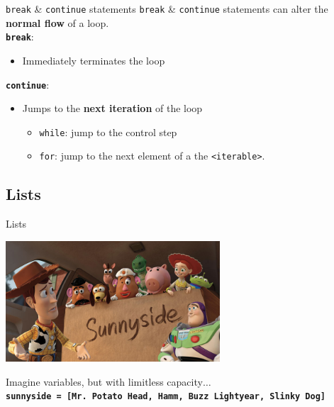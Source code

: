     \begin{frame}{\texttt{break} \& \texttt{continue} statements}
        \Large
        \texttt{break} \& \texttt{continue} statements can alter the \textbf{normal flow} of a loop.\\
        \pause
        \LARGE
        \texttt{\textbf{break}}:
        \begin{itemize}
            \pause
            \item Immediately terminates the loop
        \end{itemize}
        \pause
        \texttt{\textbf{continue}}:
        \pause
        \begin{itemize}
            \item Jumps to the \textbf{next iteration} of the loop
            \pause
            \begin{itemize}
                \large
                \item \texttt{while}: \pause jump to the control step \pause
                \item \texttt{for}: \pause jump to the next element of a the \texttt{<iterable>}.
            \end{itemize}
        \end{itemize}
    \end{frame}

    \subsection{Lists}

        \begin{frame}{Lists}
            \begin{center}
                \includegraphics[width=0.6\textwidth]{../Lecture1/images/box_many.jpg}                
            \end{center}
            \LARGE
            Imagine variables, but with limitless capacity$\dots$\\
            \textbf{\texttt{sunnyside = [\textquotesingle Mr. Potato Head\textquotesingle, \textquotesingle Hamm\textquotesingle,
            \textquotesingle Buzz Lightyear\textquotesingle, \textquotesingle Slinky Dog\textquotesingle]}}
        \end{frame}

